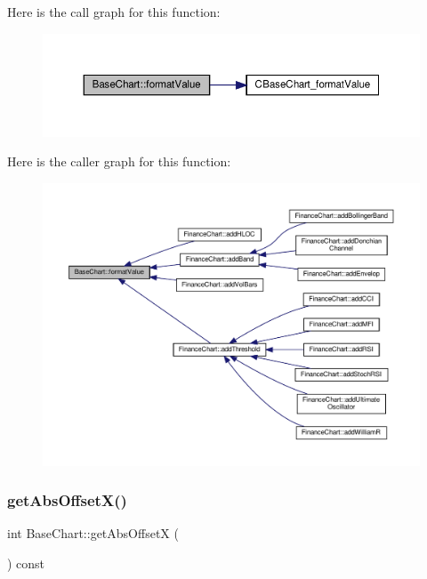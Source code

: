 Here is the call graph for this function\+:
\nopagebreak
\begin{figure}[H]
\begin{center}
\leavevmode
\includegraphics[width=350pt]{class_base_chart_a4d416306451019458d6de5dbc3dd952f_cgraph}
\end{center}
\end{figure}
Here is the caller graph for this function\+:
\nopagebreak
\begin{figure}[H]
\begin{center}
\leavevmode
\includegraphics[width=350pt]{class_base_chart_a4d416306451019458d6de5dbc3dd952f_icgraph}
\end{center}
\end{figure}
\mbox{\label{class_base_chart_a57090d85dc5afd9ecc627e8727c00d19}} 
\subsubsection{\texorpdfstring{get\+Abs\+Offset\+X()}{getAbsOffsetX()}}
{\footnotesize\ttfamily int Base\+Chart\+::get\+Abs\+OffsetX (\begin{DoxyParamCaption}{ }\end{DoxyParamCaption}) const\hspace{0.3cm}{\ttfamily [inline]}}



